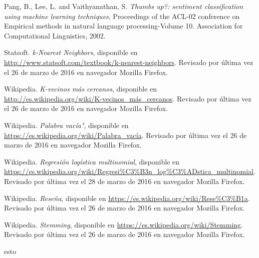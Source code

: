 \documentclass[hidelinks]{sig-alternate-05-2015}
\begin{document}
\begin{thebibliography}{1}
 Pang, B., Lee, L. and Vaithyanathan, S. \emph{Thumbs up?: sentiment classification using machine learning techniques}, Proceedings of the ACL-02 conference on Empirical methods in natural language processing-Volume 10. Association for Computational Linguistics, 2002.

  Statsoft. \emph{k-Nearest Neighbors}, disponible en \url{http://www.statsoft.com/textbook/k-nearest-neighbors}. Revisado por última vez el 26 de marzo de 2016 en navegador Mozilla Firefox.

 Wikipedia. \emph{K-vecinos más cercanos}, disponible en \url{http://es.wikipedia.org/wiki/K-vecinos\_más\_cercanos}. Revisado por última vez el 26 de marzo de 2016 en navegador Mozilla Firefox.

 Wikipedia. \emph{Palabra vacía"}, disponible en \url{https://es.wikipedia.org/wiki/Palabra_vacía}. Revisado por última vez el 26 de marzo de 2016 en navegador Mozilla Firefox.

 Wikipedia. \emph{Regresión logística multinomial}, disponible en \url{https://es.wikipedia.org/wiki/Regresi\%C3\%B3n_log\%C3\%ADstica_multinomial}. Revisado por última vez el 28 de marzo de 2016 en navegador Mozilla Firefox.

 Wikipedia. \emph{Reseña}, disponible en \url{https://es.wikipedia.org/wiki/Rese\%C3\%B1a}. Revisado por última vez el 26 de marzo de 2016 en navegador Mozilla Firefox.

 Wikipedia. \emph{Stemming}, disponible en \url{https://es.wikipedia.org/wiki/Stemming}. Revisado por última vez el 26 de marzo de 2016 en navegador Mozilla Firefox.



\end{thebibliography}esto 
\end{document}
